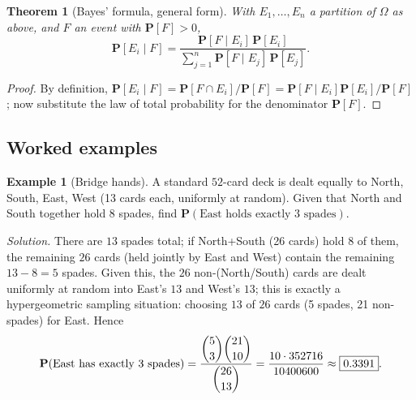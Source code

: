 \documentclass[11pt]{article}
\theoremstyle{definition}
\newtheorem{example}[definition]{Example}
\theoremstyle{plain}
\newtheorem{theorem}[definition]{Theorem}
\theoremstyle{remark}
\begin{document}
\begin{theorem}[Bayes' formula, general form]
\label{thm:bayes}
With $E_1,\dots,E_n$ a partition of $\Omega$ as above, and $F$ an event with $\mathbf{P}[F]>0$,
\[
\mathbf{P}[E_i \mid F] = \frac{\mathbf{P}[F\mid E_i]\,\mathbf{P}[E_i]}
{\sum_{j=1}^n \mathbf{P}[F\mid E_j]\,\mathbf{P}[E_j]}.
\]
\end{theorem}
\begin{proof}
By definition, $\mathbf{P}[E_i\mid F] = \mathbf{P}[F\cap E_i]/\mathbf{P}[F] =
\mathbf{P}[F\mid E_i]\mathbf{P}[E_i]/\mathbf{P}[F]$; now substitute the law of total probability
for the denominator $\mathbf{P}[F]$.
\end{proof}

\subsection{Worked examples}

\begin{example}[Bridge hands]
A standard $52$-card deck is dealt equally to North, South, East, West (13 cards each, uniformly
at random). Given that North and South together hold $8$ spades, find $\mathbf{P}(\text{East holds
exactly 3 spades})$.

\emph{Solution.} There are $13$ spades total; if North+South (26 cards) hold $8$ of them, the
remaining $26$ cards (held jointly by East and West) contain the remaining $13-8=5$ spades. Given
this, the $26$ non-(North/South) cards are dealt uniformly at random into East's $13$ and West's
$13$; this is exactly a hypergeometric sampling situation: choosing $13$ of $26$ cards (5 spades,
21 non-spades) for East. Hence
\[
\mathbf{P}(\text{East has exactly 3 spades}) = \frac{\dbinom{5}{3}\dbinom{21}{10}}{\dbinom{26}{13}}
= \frac{10\cdot 352716}{10400600} \approx \boxed{0.3391}.
\]
\end{example}
\end{document}
